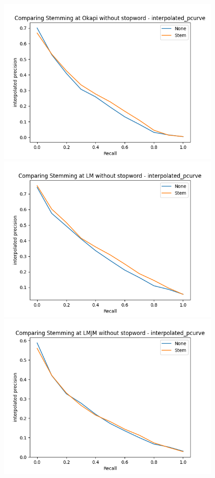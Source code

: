 \documentclass[10pt, a4paper]{article}
\begin{document}
\begin{figure}[h!]
\centering
\includegraphics[scale=0.3]{compare stem/Comparing Stemming at Okapi without stopword - interpolated_pcurve-ipd.png}
\includegraphics[scale=0.3]{compare stem/Comparing Stemming at LM without stopword - interpolated_pcurve-ipd.png}
\includegraphics[scale=0.3]{compare stem/Comparing Stemming at LMJM without stopword - interpolated_pcurve-ipd.png}

\end{figure}
\end{document}
